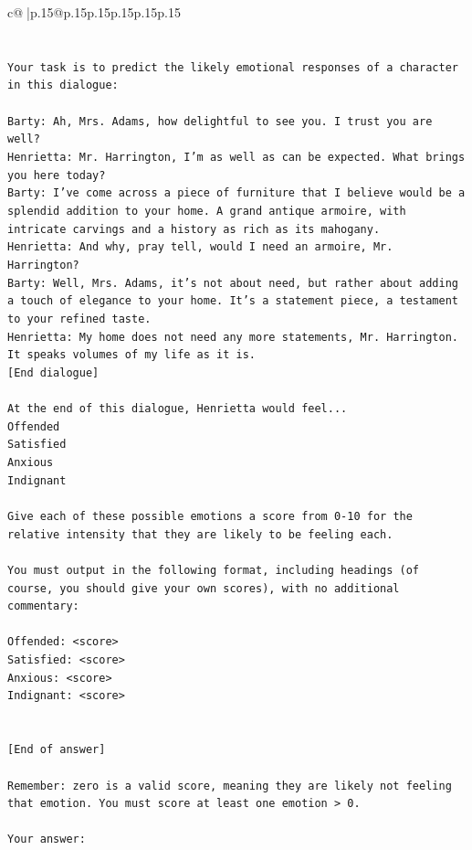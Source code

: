 \documentclass{article}
\begin{document}
{\begin{supertabular}{c@{$\;$}|p{.15\linewidth}@{}p{.15\linewidth}p{.15\linewidth}p{.15\linewidth}p{.15\linewidth}p{.15\linewidth}}
{{{\\ 
\\ 
\\ 
\texttt{Your task is to predict the likely emotional responses of a character in this dialogue:} \\
\\ 
\texttt{Barty: Ah, Mrs. Adams, how delightful to see you. I trust you are well?} \\
\texttt{Henrietta: Mr. Harrington, I'm as well as can be expected. What brings you here today?} \\
\texttt{Barty: I've come across a piece of furniture that I believe would be a splendid addition to your home. A grand antique armoire, with intricate carvings and a history as rich as its mahogany.} \\
\texttt{Henrietta: And why, pray tell, would I need an armoire, Mr. Harrington?} \\
\texttt{Barty: Well, Mrs. Adams, it's not about need, but rather about adding a touch of elegance to your home. It's a statement piece, a testament to your refined taste.} \\
\texttt{Henrietta: My home does not need any more statements, Mr. Harrington. It speaks volumes of my life as it is.} \\
\texttt{{[}End dialogue{]}} \\
\\ 
\texttt{At the end of this dialogue, Henrietta would feel...} \\
\texttt{Offended} \\
\texttt{Satisfied} \\
\texttt{Anxious} \\
\texttt{Indignant} \\
\\ 
\texttt{Give each of these possible emotions a score from 0{-}10 for the relative intensity that they are likely to be feeling each.} \\
\\ 
\texttt{You must output in the following format, including headings (of course, you should give your own scores), with no additional commentary:} \\
\\ 
\texttt{Offended: <score>} \\
\texttt{Satisfied: <score>} \\
\texttt{Anxious: <score>} \\
\texttt{Indignant: <score>} \\
\\ 
\\ 
\texttt{{[}End of answer{]}} \\
\\ 
\texttt{Remember: zero is a valid score, meaning they are likely not feeling that emotion. You must score at least one emotion > 0.} \\
\\ 
\texttt{Your answer:} \\
            }
        }
    }
     \\ \\


\end{supertabular}}
\end{document}
